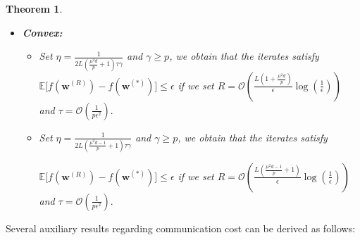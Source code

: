 \documentclass{article}
\newtheorem{theorem}{Theorem}
\begin{document}
\begin{theorem}
\begin{itemize}
\begin{itemize}
     $R=\mathcal{O}\left(\left(\frac{\mu^2d-1}{p}+1\right)\kappa\log\left(\frac{1}{\epsilon}\right)\right)$ and $ \tau=\mathcal{O}\left(\frac{1}{p\epsilon}\right)$. 
      \end{itemize}
      
     \item \textbf{Convex:}
     \begin{itemize}
         \item [\texttt{PRIVIX}] Set $\eta=\frac{1}{2L\left(\frac{\mu^2d}{p}+1\right)\tau\gamma}$ and $\gamma\geq p$, we obtain that the iterates satisfy $ \mathbb{E}\Big[f({\boldsymbol{w}}^{(R)})-f({\boldsymbol{w}}^{(*)})\Big]\leq \epsilon$ if we set
     $R=\mathcal{O}\left(\frac{L\left(1+\frac{\mu^2d}{p}\right)}{\epsilon}\log\left(\frac{1}{\epsilon}\right)\right)$ and $ \tau=\mathcal{O}\left(\frac{1}{p\epsilon^2}\right).$
         \item [\texttt{HEAPRIX}] Set $\eta=\frac{1}{2L\left(\frac{\mu^2d-1}{p}+1\right)\tau\gamma}$ and $\gamma\geq p$, we obtain that the iterates satisfy 

$ \mathbb{E}\Big[f({\boldsymbol{w}}^{(R)})-f({\boldsymbol{w}}^{(*)})\Big]\leq \epsilon$ if we set
     $R=\mathcal{O}\left(\frac{L\left(\frac{\mu^2d-1}{p}+1\right)}{\epsilon}\log\left(\frac{1}{\epsilon}\right)\right)$ and $ \tau=\mathcal{O}\left(\frac{1}{p\epsilon^2}\right).$ 
     \end{itemize}
 \end{itemize}
\end{theorem}


Several auxiliary results regarding communication cost can be derived as follows:
\end{document}
